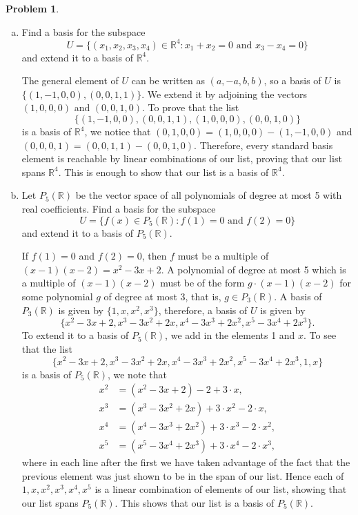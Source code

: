 \documentclass[11pt,oneside]{amsart}
\theoremstyle{definition}
\newtheorem{problem}{Problem}
\newcommand{\bR}{\mathbb{R}}
\begin{document}
    \begin{problem}
        \leavevmode\begin{enumerate}[(a)]
            \item Find a basis for the subspace
            \[U=\{(x_1,x_2,x_3,x_4)\in\bR^4:x_1+x_2=0\text{ and }x_3-x_4=0\}\]
            and extend it to a basis of $\bR^4$.
            \begin{solution}
                The general element of $U$ can be written as $(a,-a,b,b)$, so a basis of $U$ is $\{(1,-1,0,0),(0,0,1,1)\}$. We extend it by adjoining the vectors $(1,0,0,0)$ and $(0,0,1,0)$. To prove that the list
                \[\{(1,-1,0,0),(0,0,1,1),(1,0,0,0),(0,0,1,0)\}\]
                is a basis of $\bR^4$, we notice that $(0,1,0,0)=(1,0,0,0)-(1,-1,0,0)$ and $(0,0,0,1)=(0,0,1,1)-(0,0,1,0)$. Therefore, every standard basis element is reachable by linear combinations of our list, proving that our list spans $\bR^4$. This is enough to show that our list is a basis of $\bR^4$.
            \end{solution}
            \item Let $P_5(\bR)$ be the vector space of all polynomials of degree at most 5 with real coefficients. Find a basis for the subspace
            \[U=\{f(x)\in P_5(\bR):f(1)=0\text{ and }f(2)=0\}\]
            and extend it to a basis of $P_5(\bR)$.
            \begin{solution}
                If $f(1)=0$ and $f(2)=0$, then $f$ must be a multiple of $(x-1)(x-2)=x^2-3x+2$. A polynomial of degree at most 5 which is a multiple of $(x-1)(x-2)$ must be of the form $g\cdot(x-1)(x-2)$ for some polynomial $g$ of degree at most 3, that is, $g\in P_3(\bR)$. A basis of $P_3(\bR)$ is given by $\{1,x,x^2,x^3\}$, therefore, a basis of $U$ is given by
                \[\{x^2-3x+2,x^3-3x^2+2x,x^4-3x^3+2x^2,x^5-3x^4+2x^3\}.\]
                To extend it to a basis of $P_5(\bR)$, we add in the elements 1 and $x$. To see that the list
                \[\{x^2-3x+2,x^3-3x^2+2x,x^4-3x^3+2x^2,x^5-3x^4+2x^3,1,x\}\]
                is a basis of $P_5(\bR)$, we note that
                \begin{align*}
                    x^2 &=(x^2-3x+2)-2+3\cdot x,\\
                    x^3 &=(x^3-3x^2+2x)+3\cdot x^2-2\cdot x,\\
                    x^4 &= (x^4-3x^3+2x^2)+3\cdot x^3-2\cdot x^2,\\
                    x^5 &= (x^5-3x^4+2x^3)+3\cdot x^4-2\cdot x^3,
                \end{align*}
                where in each line after the first we have taken advantage of the fact that the previous element was just shown to be in the span of our list. Hence each of $1,x,x^2,x^3,x^4,x^5$ is a linear combination of elements of our list, showing that our list spans $P_5(\bR)$. This shows that our list is a basis of $P_5(\bR)$.
            \end{solution}
        \end{enumerate}
    \end{problem}
\end{document}
